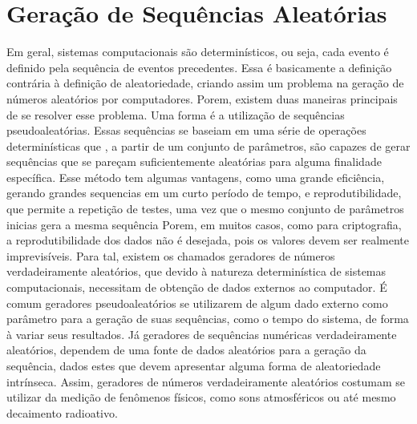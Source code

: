 \section{Geração de Sequências Aleatórias}
Em geral, sistemas computacionais são determinísticos, ou seja, cada evento é definido pela sequência de eventos precedentes. Essa é basicamente a definição contrária à definição de aleatoriedade, criando assim um problema na geração de números aleatórios por computadores. Porem, existem duas maneiras principais de se resolver esse problema.
Uma forma é a utilização de sequências pseudoaleatórias. Essas sequências se baseiam em uma série de operações determinísticas que , a partir de um conjunto de parâmetros, são capazes de gerar sequências que se pareçam suficientemente aleatórias para alguma finalidade específica. Esse método tem algumas vantagens, como uma grande eficiência, gerando grandes sequencias em um curto período de tempo, e reprodutibilidade, que permite a repetição de testes, uma vez que o mesmo conjunto de parâmetros inicias gera a mesma sequência
Porem, em muitos casos, como para criptografia, a reprodutibilidade dos dados não é desejada, pois os valores devem ser realmente imprevisíveis. Para tal, existem os chamados geradores de números verdadeiramente aleatórios, que devido à natureza determinística de sistemas computacionais, necessitam de obtenção de dados externos ao computador. 
É comum geradores pseudoaleatórios se utilizarem de algum dado externo como parâmetro para a geração de suas sequências, como o tempo do sistema, de forma à variar seus resultados. Já geradores de sequências numéricas verdadeiramente aleatórios, dependem de uma fonte de dados aleatórios para a geração da sequência, dados estes que devem apresentar alguma forma de aleatoriedade intrínseca. Assim, geradores de números verdadeiramente aleatórios costumam se utilizar da medição de fenômenos físicos, como sons atmosféricos ou até mesmo decaimento radioativo.
